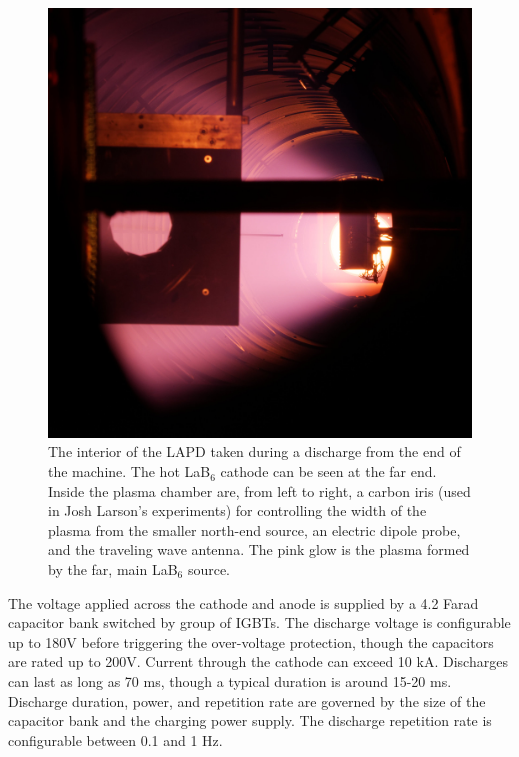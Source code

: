 \begin{figure}
	\centering
	\includegraphics[width=350pt]{figures/lapd_inside.jpg}
	\caption[Picture of LAPD interior]{\label{fig:lapd-inside}The interior of the LAPD taken during a discharge from the end of the machine. The hot LaB$_6$ cathode can be seen at the far end. Inside the plasma chamber are, from left to right, a carbon iris (used in Josh Larson's experiments) for controlling the width of the plasma from the smaller north-end source, an electric dipole probe, and the traveling wave antenna. The pink glow is the plasma formed by the far, main LaB$_6$ source.}
\end{figure}


The voltage applied across the cathode and anode is supplied by a 4.2 Farad capacitor bank switched by group of IGBTs. The discharge voltage is configurable up to 180V before triggering the over-voltage protection, though the capacitors are rated up to 200V. Current through the cathode can exceed 10 kA. Discharges can last as long as 70 ms, though a typical duration is around 15-20 ms. Discharge duration, power, and repetition rate are governed by the size of the capacitor bank and the charging power supply. The discharge repetition rate is configurable between 0.1 and 1 Hz.

